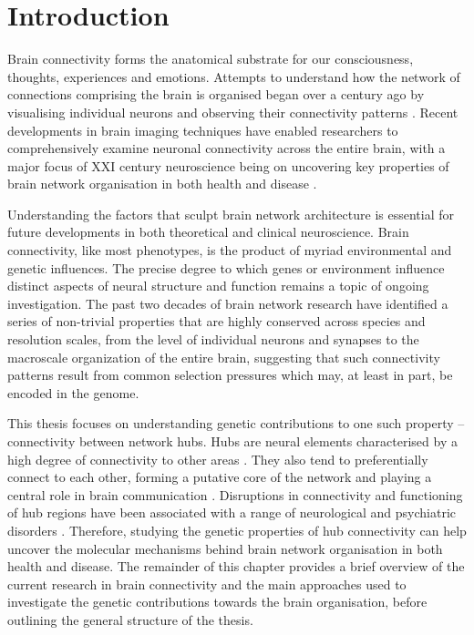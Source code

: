 \chapter{Introduction}
\label{ch:Introduction}

Brain connectivity forms the anatomical substrate for our consciousness, thoughts, experiences and emotions. Attempts to understand how the network of connections comprising the brain is organised began over a century ago by visualising individual neurons and observing their connectivity patterns \citep{RamonyCajal1995}. Recent developments in brain imaging techniques have enabled researchers to comprehensively examine neuronal connectivity across the entire brain, with a major focus of XXI century neuroscience being on uncovering key properties of brain network organisation in both health and disease \mbox{\citep{VandenHeuvel2010b,Bullmore2012,Fornito2015}}.

Understanding the factors that sculpt brain network architecture is essential for future developments in both theoretical and clinical neuroscience. Brain connectivity, like most phenotypes, is the product of myriad environmental and genetic influences. The precise degree to which genes or environment influence distinct aspects of neural structure and function remains a topic of ongoing investigation. The past two decades of brain network research have identified a series of non-trivial properties that are highly conserved across species and resolution scales, from the level of individual neurons and synapses to the macroscale organization of the entire brain, suggesting that such connectivity patterns result from common selection pressures which may, at least in part, be encoded in the genome.

This thesis focuses on understanding genetic contributions to one such property -- connectivity between network hubs. Hubs are neural elements  characterised by a high degree of connectivity to other areas \citep{VandenHeuvel2013b}. They also tend to preferentially connect to each other, forming a putative core of the network and playing a central role in brain communication \citep{VandenHeuvel2011,VandenHeuvel2013a}. Disruptions in connectivity and functioning of hub regions have been associated with a range of neurological and psychiatric disorders \mbox{\citep{Crossley2014,VandenHeuvel2013b,Fornito2015}}. Therefore, studying the genetic properties of hub connectivity can help uncover the molecular mechanisms behind brain network organisation in both health and disease. The remainder of this chapter provides a brief overview of the current research in brain connectivity and the main approaches used to investigate the genetic contributions towards the brain organisation, before outlining the general structure of the thesis.


